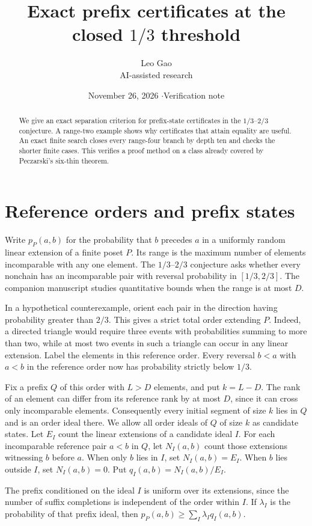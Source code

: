 \documentclass[11pt]{article}
\title{Exact prefix certificates at the closed $1/3$ threshold}
\author{Leo Gao\\[-1pt]{\small AI-assisted research}}
\date{November 26, 2026 \quad$\cdot$\quad Verification note}
\begin{document}
\maketitle
\begin{abstract}
We give an exact separation criterion for prefix-state certificates in the $1/3$--$2/3$ conjecture. A range-two example shows why certificates that attain equality are useful. An exact finite search closes every range-four branch by depth ten and checks the shorter finite cases. This verifies a proof method on a class already covered by Peczarski's six-thin theorem.
\end{abstract}

\section{Reference orders and prefix states}

Write $p_P(a,b)$ for the probability that $b$ precedes $a$ in a uniformly random linear extension of a finite poset $P$. Its range is the maximum number of elements incomparable with any one element. The $1/3$--$2/3$ conjecture asks whether every nonchain has an incomparable pair with reversal probability in $[1/3,2/3]$. The companion manuscript studies quantitative bounds when the range is at most $D$.

In a hypothetical counterexample, orient each pair in the direction having probability greater than $2/3$. This gives a strict total order extending $P$. Indeed, a directed triangle would require three events with probabilities summing to more than two, while at most two events in such a triangle can occur in any linear extension. Label the elements in this reference order. Every reversal $b<a$ with $a<b$ in the reference order now has probability strictly below $1/3$.

Fix a prefix $Q$ of this order with $L>D$ elements, and put $k=L-D$. The rank of an element can differ from its reference rank by at most $D$, since it can cross only incomparable elements. Consequently every initial segment of size $k$ lies in $Q$ and is an order ideal there. We allow all order ideals of $Q$ of size $k$ as candidate states. Let $E_I$ count the linear extensions of a candidate ideal $I$. For each incomparable reference pair $a<b$ in $Q$, let $N_I(a,b)$ count those extensions witnessing $b$ before $a$. When only $b$ lies in $I$, set $N_I(a,b)=E_I$. When $b$ lies outside $I$, set $N_I(a,b)=0$. Put $q_I(a,b)=N_I(a,b)/E_I$.

The prefix conditioned on the ideal $I$ is uniform over its extensions, since the number of suffix completions is independent of the order within $I$. If $\lambda_I$ is the probability of that prefix ideal, then $p_P(a,b)\ge\sum_I\lambda_I q_I(a,b)$.
\end{document}
